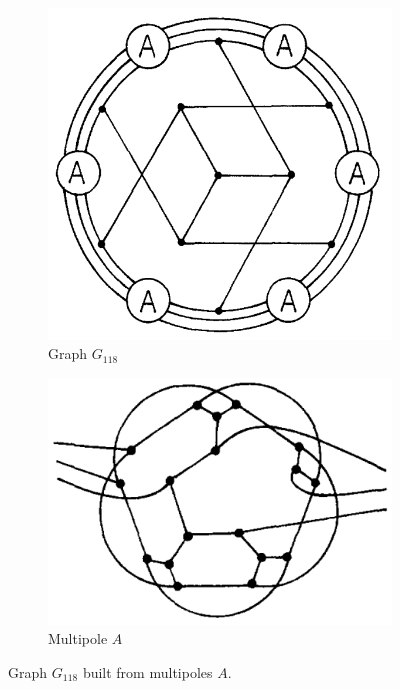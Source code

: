 \documentclass[12pt, twoside]{book}
\begin{document}
\begin{example}
	\begin{figure}
		\centering
		\begin{subfigure}[b]{0.45\textwidth}
			\centering
			\includegraphics[width=\textwidth]{images/Kochol-article/Kochol-final-graph}
			\caption{Graph $G_{118}$}
			\label{fig:Kochol-final-graph-G118}
		\end{subfigure}
		\hfill
		\begin{subfigure}[b]{0.45\textwidth}
			\centering
			\includegraphics[width=\textwidth]{images/Kochol-article/Kochol-multipole-A}
			\caption{Multipole $A$}
			\label{fig:Kochol-multipole-A}
		\end{subfigure}
		\caption{\cite{Kochol1996} Graph $G_{118}$ built from multipoles $A$.}
	\end{figure}
	

\end{example}
\end{document}
